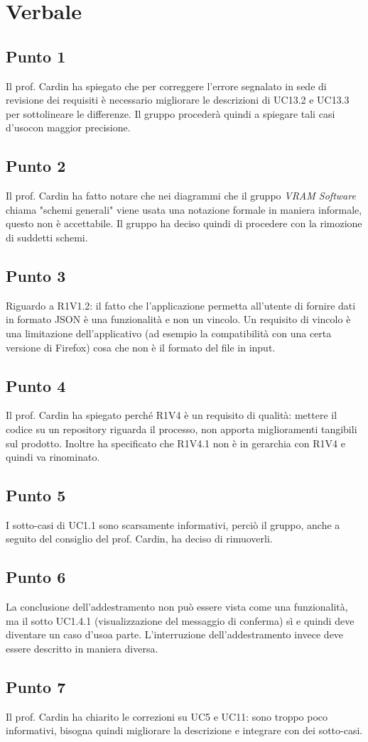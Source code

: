 \section{Verbale}
	\subsection{Punto 1}
	Il prof. Cardin ha spiegato che per correggere l'errore segnalato in sede di revisione dei requisiti è necessario migliorare le descrizioni di UC13.2 e UC13.3 per sottolineare le differenze. Il gruppo procederà quindi a spiegare tali casi d'uso\glosp con maggior precisione.
	
    \subsection{Punto 2}
    Il prof. Cardin ha fatto notare che nei diagrammi che il gruppo \textit{VRAM Software} chiama "schemi generali" viene usata una notazione formale in maniera informale, questo non è accettabile. Il gruppo ha deciso quindi di procedere con la rimozione di suddetti schemi.
    
    \subsection{Punto 3}
    Riguardo a R1V1.2: il fatto che l'applicazione permetta all'utente di fornire dati in formato JSON è una funzionalità e non un vincolo. Un requisito di vincolo è una limitazione dell'applicativo (ad esempio la compatibilità con una certa versione di Firefox) cosa che non è il formato del file in input.
    
    \subsection{Punto 4}
    Il prof. Cardin ha spiegato perché R1V4 è un requisito di qualità: mettere il codice su un repository riguarda il processo, non apporta miglioramenti tangibili sul prodotto. Inoltre ha specificato che R1V4.1 non è in gerarchia con R1V4 e quindi va rinominato.
    
    \subsection{Punto 5}
    I sotto-casi di UC1.1 sono scarsamente informativi, perciò il gruppo, anche a seguito del consiglio del prof. Cardin, ha deciso di rimuoverli.
    
    \subsection{Punto 6}
    La conclusione dell'addestramento non può essere vista come una funzionalità, ma il sotto UC1.4.1 (visualizzazione del messaggio di conferma) sì e quindi deve diventare un caso d'uso\glosp a parte. L'interruzione dell'addestramento invece deve essere descritto in maniera diversa.
    
    \subsection{Punto 7}
    Il prof. Cardin ha chiarito le correzioni su UC5 e UC11: sono troppo poco informativi, bisogna quindi migliorare la descrizione e integrare con dei sotto-casi.
    
    
    
    
  
       